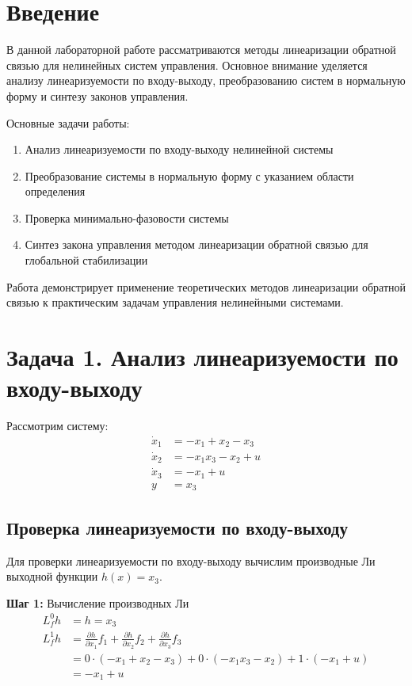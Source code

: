 \section{Введение}

В данной лабораторной работе рассматриваются методы линеаризации обратной связью для нелинейных систем управления. Основное внимание уделяется анализу линеаризуемости по входу-выходу, преобразованию систем в нормальную форму и синтезу законов управления.

Основные задачи работы:
\begin{enumerate}
\item Анализ линеаризуемости по входу-выходу нелинейной системы
\item Преобразование системы в нормальную форму с указанием области определения
\item Проверка минимально-фазовости системы
\item Синтез закона управления методом линеаризации обратной связью для глобальной стабилизации
\end{enumerate}

Работа демонстрирует применение теоретических методов линеаризации обратной связью к практическим задачам управления нелинейными системами.

\section{Задача 1. Анализ линеаризуемости по входу-выходу}

Рассмотрим систему:
\begin{align}
\dot{x}_1 &= -x_1 + x_2 - x_3 \\
\dot{x}_2 &= -x_1 x_3 - x_2 + u \\
\dot{x}_3 &= -x_1 + u \\
y &= x_3
\end{align}

\subsection{Проверка линеаризуемости по входу-выходу}

Для проверки линеаризуемости по входу-выходу вычислим производные Ли выходной функции $h(x) = x_3$.

\textbf{Шаг 1:} Вычисление производных Ли
\begin{align}
L_f^0 h &= h = x_3 \\
L_f^1 h &= \frac{\partial h}{\partial x_1} f_1 + \frac{\partial h}{\partial x_2} f_2 + \frac{\partial h}{\partial x_3} f_3 \\
&= 0 \cdot (-x_1 + x_2 - x_3) + 0 \cdot (-x_1 x_3 - x_2) + 1 \cdot (-x_1 + u) \\
&= -x_1 + u
\end{align}

